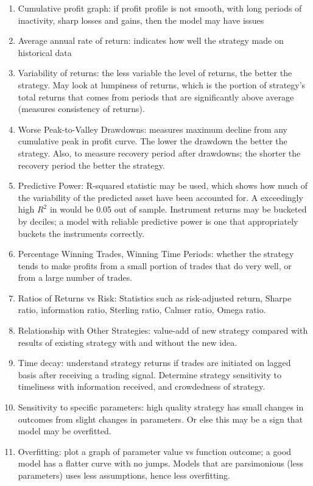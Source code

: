 \documentclass[a4paper,oneside,openany]{book}
\begin{document}
\begin{remark} 
\begin{enumerate}[label=\roman*.]
\setlength{\itemsep}{0pt}
\item Cumulative profit graph: if profit profile is not smooth, with long periods of inactivity, sharp losses and gains, then the model may have issues
\item Average annual rate of return: indicates how well the strategy made on historical data
\item Variability of returns: the less variable the level of returns, the better the strategy. May look at lumpiness of returns, which is the portion of strategy's total returns that comes from periods that are significantly above average (measures consistency of returns).
\item Worse Peak-to-Valley Drawdowns: measures maximum decline from any cumulative peak in profit curve. The lower the drawdown the better the strategy. Also, to measure recovery period after drawdowns; the shorter the recovery period the better the strategy.
\item Predictive Power: R-squared statistic may be used, which shows how much of the variability of the predicted asset have been accounted for. A exceedingly high $R^2$ in would be 0.05 out of sample. Instrument returns may be bucketed by deciles; a model with reliable predictive power is one that appropriately buckets the instruments correctly.
\item Percentage Winning Trades, Winning Time Periods: whether the strategy tends to make profits from a small portion of trades that do very well, or from a large number of trades. 
\item Ratios of Returns vs Risk: Statistics such as risk-adjusted return, Sharpe ratio, information ratio, Sterling ratio, Calmer ratio, Omega ratio.
\item Relationship with Other Strategies: value-add of new strategy compared with results of existing strategy with and without the new idea.
\item Time decay: understand strategy returns if trades are initiated on lagged basis after receiving a trading signal. Determine strategy sensitivity to timeliness with information received, and crowdedness of strategy.
\item Sensitivity to specific parameters: high quality strategy has small changes in outcomes from slight changes in parameters. Or else this may be a sign that model may be overfitted.
\item Overfitting: plot a graph of parameter value vs function outcome; a good model has a flatter curve with no jumps.  Models that are parsimonious (less parameters) uses less assumptions, hence less overfitting.
\end{enumerate}
\end{remark}
\end{document}
